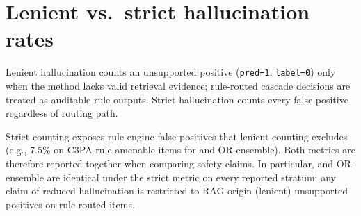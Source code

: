 \section{Lenient vs.\ strict hallucination rates}
\label{app:hallucination}

Lenient hallucination counts an unsupported positive (\texttt{pred=1}, \texttt{label=0}) only when the method lacks valid retrieval evidence; rule-routed cascade decisions are treated as auditable rule outputs. Strict hallucination counts every false positive regardless of routing path.

\begin{table}[t]
\centering
\caption{Hallucination metric sensitivity (Tier-1 replication, \%)}
\label{tab:hallucination_sensitivity}
\small
{}
\end{table}

Strict counting exposes rule-engine false positives that lenient counting excludes (e.g., 7.5\% on C3PA rule-amenable items for \HRAG{} and OR-ensemble). Both metrics are therefore reported together when comparing safety claims. In particular, \HRAG{} and OR-ensemble are identical under the strict metric on every reported stratum; any claim of reduced hallucination is restricted to RAG-origin (lenient) unsupported positives on rule-routed items.
